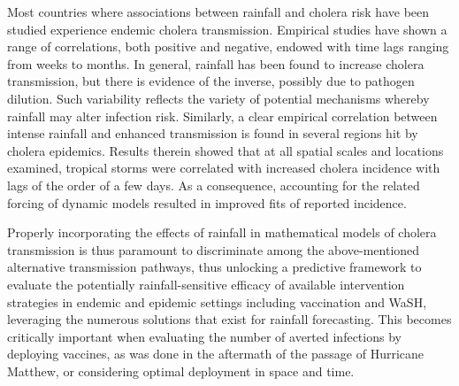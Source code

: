 Most countries where associations between rainfall and cholera risk have been studied experience endemic cholera transmission. Empirical studies have shown a range of correlations, both positive and negative, endowed with time lags ranging from weeks to months. In general, rainfall has been found to increase cholera transmission, but there is evidence of the inverse, possibly due to pathogen dilution. Such variability reflects the variety of potential mechanisms whereby rainfall may alter infection risk. Similarly, a clear empirical correlation between intense rainfall and enhanced transmission is found in several regions hit by cholera epidemics. Results therein showed that at all spatial scales and locations examined, tropical storms were correlated with increased cholera incidence with lags of the order of a few days. As a consequence, accounting for the related forcing of dynamic models resulted in improved fits of reported incidence. 

Properly incorporating the effects of rainfall in mathematical models of cholera transmission is thus paramount to discriminate among the above-mentioned alternative transmission pathways, thus unlocking a predictive framework to evaluate the potentially rainfall-sensitive efficacy of available intervention strategies in endemic and epidemic settings including vaccination and WaSH, leveraging the numerous solutions that exist for rainfall forecasting. This becomes  critically important when evaluating the number of averted infections by deploying vaccines, as was done in the aftermath of the passage of Hurricane Matthew, or considering optimal deployment in space and time.

